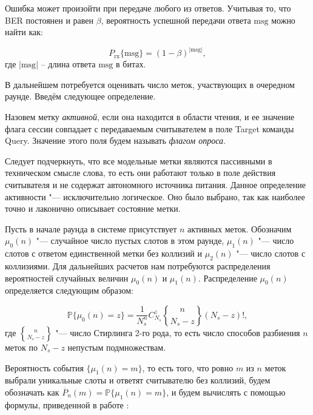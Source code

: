 Ошибка может произойти при передаче любого из ответов. Учитывая то, что BER постоянен и равен $\beta$, вероятность успешной передачи ответа $\text{msg}$ можно найти как:

\begin{equation}\label{eq:ch3_response_err}
	P_\text{rx}\{\text{msg}\} = (1 - \beta)^{|\text{msg}|},
\end{equation}
где $|\text{msg}|$ -- длина ответа $\text{msg}$ в битах.

В дальнейшем потребуется оценивать число меток, участвующих в очередном раунде. Введём следующее определение.

\begin{defn}
	Назовем метку \textit{активной}, если она находится в области чтения, и ее значение флага сессии совпадает с передаваемым считывателем в поле Target команды Query. Значение этого поля будем называть \textit{флагом опроса}.
\end{defn}
\begin{rem}
	Следует подчеркнуть, что все модельные метки являются пассивными в техническом смысле слова, то есть они работают только в поле действия считывателя и не содержат автономного источника питания. Данное определение активности "--- исключительно логическое. Оно было выбрано, так как наиболее точно и лаконично описывает состояние метки.
\end{rem}

Пусть в начале раунда в системе присутствует $n$ активных меток. Обозначим $\mu_0(n)$ "--- случайное число пустых слотов в этом раунде, $\mu_1(n)$ "--- число слотов с ответом единственной метки без коллизий и $\mu_2(n)$ "--- число слотов с коллизиями. Для дальнейших расчетов нам потребуются распределения вероятностей случайных величин $\mu_0(n)$ и $\mu_1(n)$. Распределение $\mu_0(n)$ определяется следующим образом:

\begin{equation}\label{eq:ch3_empty_slots}
	\mathbb{P}\{\mu_0(n) = z\} = \frac{1}{N_s^n} C_{N_s}^z {n\brace N_s-z} (N_s - z)!,
\end{equation}
где ${ n\brace N_s-z }$ "--- число Стирлинга 2-го рода, то есть число способов разбиения $n$ меток по $N_s - z$ непустым подмножествам.

Вероятность события $\{ \mu_1(n) = m \}$, то есть того, что ровно $m$ из $n$ меток выбрали уникальные слоты и ответят считывателю без коллизий, будем обозначать как $\overline{P}_n(m) = \mathbb{P}\{ \mu_1(n) = m \}$, и будем вычислять с помощью формулы, приведенной в работе \cite{Vales-Alonso2011}:

